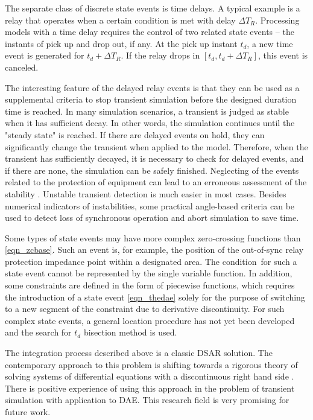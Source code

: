 \documentclass[lettersize,journal]{IEEEtran}
\begin{document}
The separate class of discrete state events is time delays. A typical example is a relay that operates when a certain condition is met with delay \(\Delta T_R\). Processing models with a time delay requires the control of two related state events -- the instants of pick up and drop out, if any. At the pick up instant \(t_d\), a new time event is generated for \(t_d+\Delta T_R\). If the relay drops in \(\left[t_d, t_d+\Delta T_R \right]\), this event is canceled.

The interesting feature of the delayed relay events is that they can be used as a supplemental criteria to stop transient simulation before the designed duration time is reached. In many simulation scenarios, a transient is judged as stable when it has sufficient decay. In other words, the simulation continues until the "steady state" is reached. If there are delayed events on hold, they can significantly change the transient when applied to the model. Therefore, when the transient has sufficiently decayed, it is necessary to check for delayed events, and if there are none, the simulation can be safely finished. Neglecting of the events related to the protection of equipment can lead to an erroneous assessment of the stability \cite{VanCutsem2020}. Unstable transient detection is much easier in most cases. Besides numerical indicators of instabilities, some practical angle-based criteria can be used to detect loss of synchronous operation and abort simulation to save time.

Some types of state events may have more complex zero-crossing functions than \eqref{eqn_zcbase}. Such an event is, for example, the position of the out-of-sync relay protection impedance point within a designated area. The condition for such a state event cannot be represented by the single variable function. In addition, some constraints are defined in the form of piecewise functions, which requires the introduction of a state event \eqref{eqn_thedae} solely for the purpose of switching to a new segment of the constraint due to derivative discontinuity. For such complex state events, a general location procedure has not yet been developed and the search for \(t_d\) bisection method is used.

The integration process described above is a classic DSAR solution. The contemporary approach to this problem is shifting towards a rigorous theory of solving systems of differential equations with a discontinuous right hand side \cite{Filippov1988}. There is positive experience of using this approach in the problem of transient simulation \cite{Murad2019} with application to DAE. This research field is very promising for future work.
\end{document}
